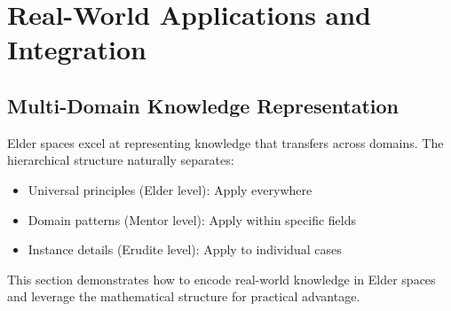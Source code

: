 
\chapter{Real-World Applications and Integration}

\section{Multi-Domain Knowledge Representation}

\begin{intuition}
Elder spaces excel at representing knowledge that transfers across domains. The hierarchical structure naturally separates:
\begin{itemize}
\item Universal principles (Elder level): Apply everywhere
\item Domain patterns (Mentor level): Apply within specific fields
\item Instance details (Erudite level): Apply to individual cases
\end{itemize}

This section demonstrates how to encode real-world knowledge in Elder spaces and leverage the mathematical structure for practical advantage.
\end{intuition}

